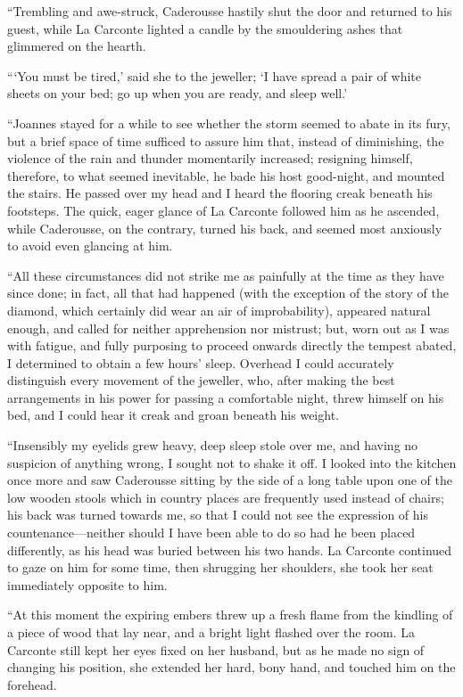 “Trembling and awe-struck, Caderousse hastily shut the door and
returned to his guest, while La Carconte lighted a candle by the
smouldering ashes that glimmered on the hearth.

“‘You must be tired,’ said she to the jeweller; ‘I have spread a pair
of white sheets on your bed; go up when you are ready, and sleep well.’

“Joannes stayed for a while to see whether the storm seemed to abate in
its fury, but a brief space of time sufficed to assure him that,
instead of diminishing, the violence of the rain and thunder
momentarily increased; resigning himself, therefore, to what seemed
inevitable, he bade his host good-night, and mounted the stairs. He
passed over my head and I heard the flooring creak beneath his
footsteps. The quick, eager glance of La Carconte followed him as he
ascended, while Caderousse, on the contrary, turned his back, and
seemed most anxiously to avoid even glancing at him.

“All these circumstances did not strike me as painfully at the time as
they have since done; in fact, all that had happened (with the
exception of the story of the diamond, which certainly did wear an air
of improbability), appeared natural enough, and called for neither
apprehension nor mistrust; but, worn out as I was with fatigue, and
fully purposing to proceed onwards directly the tempest abated, I
determined to obtain a few hours’ sleep. Overhead I could accurately
distinguish every movement of the jeweller, who, after making the best
arrangements in his power for passing a comfortable night, threw
himself on his bed, and I could hear it creak and groan beneath his
weight.

“Insensibly my eyelids grew heavy, deep sleep stole over me, and having
no suspicion of anything wrong, I sought not to shake it off. I looked
into the kitchen once more and saw Caderousse sitting by the side of a
long table upon one of the low wooden stools which in country places
are frequently used instead of chairs; his back was turned towards me,
so that I could not see the expression of his countenance—neither
should I have been able to do so had he been placed differently, as his
head was buried between his two hands. La Carconte continued to gaze on
him for some time, then shrugging her shoulders, she took her seat
immediately opposite to him.

“At this moment the expiring embers threw up a fresh flame from the
kindling of a piece of wood that lay near, and a bright light flashed
over the room. La Carconte still kept her eyes fixed on her husband,
but as he made no sign of changing his position, she extended her hard,
bony hand, and touched him on the forehead.

